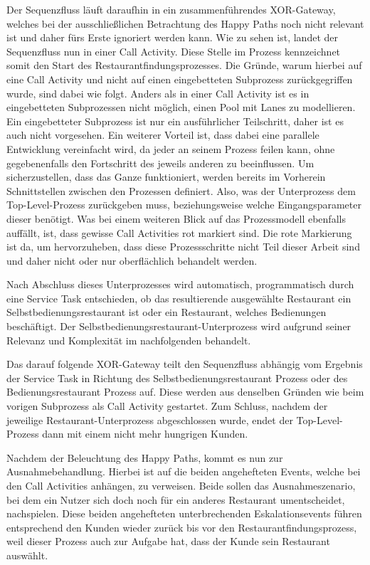 Der Sequenzfluss läuft daraufhin in ein zusammenführendes XOR-Gateway, welches bei der ausschließlichen Betrachtung des Happy Paths noch nicht relevant ist und daher fürs Erste ignoriert werden kann. Wie zu sehen ist, landet der Sequenzfluss nun in einer Call Activity. Diese Stelle im Prozess kennzeichnet somit den Start des Restaurantfindungsprozesses.
Die Gründe, warum hierbei auf eine Call Activity und nicht auf einen eingebetteten Subprozess zurückgegriffen wurde, sind dabei wie folgt. Anders als in einer Call Activity ist es in eingebetteten Subprozessen nicht möglich, einen Pool mit Lanes zu modellieren. Ein eingebetteter Subprozess ist nur ein ausführlicher Teilschritt, daher ist es auch nicht vorgesehen. Ein weiterer Vorteil ist, dass dabei eine parallele Entwicklung vereinfacht wird, da jeder an seinem Prozess feilen kann, ohne gegebenenfalls den Fortschritt des jeweils anderen zu beeinflussen. Um sicherzustellen, dass das Ganze funktioniert, werden bereits im Vorherein Schnittstellen zwischen den Prozessen definiert. Also, was der Unterprozess dem Top-Level-Prozess zurückgeben muss, beziehungsweise welche Eingangsparameter dieser benötigt. Was bei einem weiteren Blick auf das Prozessmodell ebenfalls auffällt, ist, dass gewisse Call Activities rot markiert sind. Die rote Markierung ist da, um hervorzuheben, dass diese Prozessschritte nicht Teil dieser Arbeit sind und daher nicht oder nur oberflächlich behandelt werden.

Nach Abschluss dieses Unterprozesses wird automatisch, programmatisch durch eine Service Task entschieden, ob das resultierende ausgewählte Restaurant ein Selbstbedienungsrestaurant ist oder ein Restaurant, welches Bedienungen beschäftigt. Der Selbstbedienungsrestaurant-Unterprozess wird aufgrund seiner Relevanz und Komplexität im nachfolgenden  behandelt.


Das darauf folgende XOR-Gateway teilt den Sequenzfluss abhängig vom Ergebnis der Service Task in Richtung des Selbstbedienungsrestaurant Prozess oder des Bedienungsrestaurant Prozess auf. Diese werden aus denselben Gründen wie beim vorigen Subprozess als Call Activity gestartet. Zum Schluss, nachdem der jeweilige Restaurant-Unterprozess abgeschlossen wurde, endet der Top-Level-Prozess dann mit einem nicht mehr hungrigen Kunden.

Nachdem der Beleuchtung des Happy Paths, kommt es nun zur Ausnahmebehandlung. Hierbei ist auf die beiden angehefteten Events, welche bei den Call Activities anhängen, zu verweisen. Beide sollen das Ausnahmeszenario, bei dem ein Nutzer sich doch noch für ein anderes Restaurant umentscheidet, nachspielen. Diese beiden angehefteten unterbrechenden Eskalationsevents führen entsprechend den Kunden wieder zurück bis vor den Restaurantfindungsprozess, weil dieser Prozess auch zur Aufgabe hat, dass der Kunde sein Restaurant auswählt.

